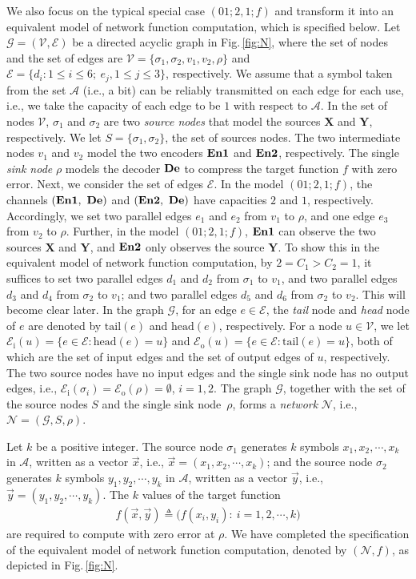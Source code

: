 \documentclass[11pt,draftclsnofoot,onecolumn]{IEEEtran}
\newcommand{\ein}{\mathcal{E}_{\mathrm{i}}}
\newcommand{\eout}{\mathcal{E}_{\mathrm{o}}}
\newcommand{\tail}{\mathrm{tail}}
\newcommand{\head}{\mathrm{head}}
\newcommand{\mA}{\mathcal{A}}
\newcommand{\mN}{\mathcal{N}}
\newcommand{\mE}{\mathcal{E}}
\newcommand{\mG}{\mathcal{G}}
\newcommand{\mV}{\mathcal{V}}
\newcommand{\Enone}{\bf{En1}}
\newcommand{\Entwo}{\bf{En2}}
\newcommand{\De}{\bf{De}}
\begin{document}
{We also focus on the typical special case $(01;2,1;f)$ and transform it into an equivalent model of network function computation, which is specified below. Let $\mG=(\mV,\mE)$ be a directed acyclic graph in Fig.\,\ref{fig:N}, where the set of nodes and the set of edges are $\mathcal{V}=\{\sigma_1,\sigma_2,v_1,v_2,\rho\}$ and $\mathcal{E}=\{d_i:1\leq i\leq 6;~e_j,1\leq j\leq 3 \}$, respectively. We assume that a symbol taken from the set $\mA$ (i.e., a bit) can be reliably transmitted on each edge for each use, i.e., we take the capacity of each edge to be $1$ with respect to $\mA$.
In the set of nodes $\mathcal{V}$, $\sigma_1$ and $\sigma_2$ are two \emph{source nodes} that  model the sources $\boldsymbol{X}$ and $\boldsymbol{Y}$, respectively.  We let $S=\{\sigma_1, \sigma_2\}$, the set of sources nodes. The two intermediate nodes $v_1$ and $v_2$  model the two encoders $\Enone$ and $\Entwo$, respectively. The single \emph{sink node} $\rho$ models the decoder $\De$ to compress the target function $f$ with zero error.  Next, we consider the set of edges $\mathcal{E}$. In the model $(01;2,1;f)$, the channels
 $(\Enone,~\De)$ and $(\Entwo,~\De)$  have capacities $2$ and $1$, respectively. Accordingly, we set two parallel edges $e_1$ and $e_2$ from $v_1$ to $\rho$, and one edge $e_3$ from $v_2$ to $\rho$. Further, in the model  $(01;2,1;f)$,  $\Enone$ can observe the two sources $\boldsymbol{X}$ and $\boldsymbol{Y}$, and $\Entwo$ only observes the source  $\boldsymbol{Y}$. To show this in the equivalent model of network function computation, by $2=C_1>C_2=1$, it suffices to set two parallel edges $d_1$ and $d_2$ from $\sigma_1$ to $v_1$, and two  parallel edges $d_3$ and $d_4$
 from $\sigma_2$ to $v_1$; and two parallel edges $d_5$ and $d_6$
 from $\sigma_2$ to $v_2$. This will become clear later. In the graph $\mathcal{G}$,
for an edge $e \in \mE$, the \emph{tail} node and \emph{head} node of $e$ are denoted by $\tail(e)$ and $\head(e)$, respectively. For a node $u \in \mV$, we let $\ein(u)=\{ e \in \mE:\head(e)=u \}$ and $\eout(u)=\{ e \in \mE:\tail(e)=u \}$, both of which are the set of input edges and the set of output edges of $u$, respectively. The two source nodes have no input edges and the single sink node  has no output edges, i.e., $\ein(\sigma_i)=\eout(\rho)=\emptyset$, $i=1,2$.  The graph $\mG$, together with the set of the source nodes $S$ and the single sink node~$\rho$, forms a \emph{network} $\mN$, i.e., $\mN=(\mG, S, \rho)$.

Let
$k$ be a positive integer. The  source node $\sigma_1$ generates $k$ symbols $x_{1},x_{2},\cdots,x_{k}$  in $\mA$, written as a vector $\vec{x}$, i.e., $\vec{x}=(x_{1},x_{2},\cdots,x_{k})$; and
the  source node $\sigma_2$ generates $k$ symbols $y_{1},y_{2},\cdots,y_{k}$  in $\mA$, written as a vector $\vec{y}$, i.e., $\vec{y}=(y_{1},y_{2},\cdots,y_{k})$.
 The $k$ values of the target function
\begin{align}\label{function_f}
f(\vec{x},\vec{y})\triangleq\big(f(x_{i},y_{i}):~ i=1,2,\cdots,k \big)\nonumber
\end{align}
are required to  compute with zero error at $\rho$. We have completed the specification of the equivalent  model of network function computation, denoted by $(\mN,f)$, as depicted in Fig.\,\ref{fig:N}.

}
\end{document}
